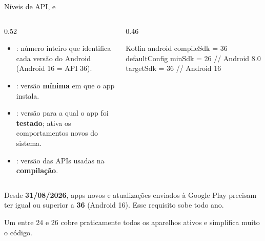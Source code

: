 \documentclass[aspectratio=169,10pt]{beamer}
\begin{document}
\begin{frame}[fragile]{Níveis de API}{,  e }
  \begin{columns}[T]
    \begin{column}{0.52\textwidth}
      \small
      \begin{itemize}
        \item {}: número inteiro que identifica cada versão do Android (Android 16 = API 36).
        \item {}: versão \textbf{mínima} em que o app instala.
        \item {}: versão para a qual o app foi \textbf{testado}; ativa os comportamentos novos do sistema.
        \item {}: versão das APIs usadas na \textbf{compilação}.
      \end{itemize}
    \end{column}
    \begin{column}{0.46\textwidth}
\begin{codigo}[title=app/build.gradle.kts]{Kotlin}
android {
  compileSdk = 36
  defaultConfig {
    minSdk = 26     // Android 8.0
    targetSdk = 36  // Android 16
  }
}
\end{codigo}
    \end{column}
  \end{columns}
  \begin{atencao}
    Desde \textbf{31/08/2026}, apps novos e atualizações enviados à Google Play precisam ter  igual ou superior a \textbf{36} (Android 16). Esse requisito sobe todo ano.
  \end{atencao}
  \begin{dica}
    Um  entre 24 e 26 cobre praticamente todos os aparelhos ativos e simplifica muito o código.
  \end{dica}
\end{frame}
\end{document}
